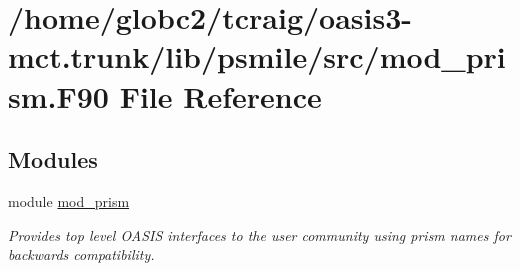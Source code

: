\hypertarget{mod__prism_8_f90}{}\section{/home/globc2/tcraig/oasis3-\/mct.trunk/lib/psmile/src/mod\+\_\+prism.F90 File Reference}
\label{mod__prism_8_f90}
\subsection*{Modules}
\begin{DoxyCompactItemize}
\item 
module \hyperlink{namespacemod__prism}{mod\+\_\+prism}
\begin{DoxyCompactList}\small\item\em Provides top level O\+A\+S\+IS interfaces to the user community using prism names for backwards compatibility. \end{DoxyCompactList}\end{DoxyCompactItemize}
